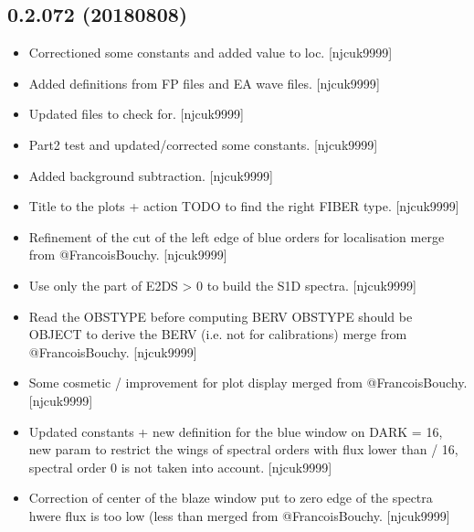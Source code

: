 \documentclass[a4paper,10pt,english]{report}
\begin{document}
\subsection{0.2.072 (2018\sphinxhyphen{}08\sphinxhyphen{}08)}
\label{\detokenize{misc/changelog:id395}}\begin{itemize}
\item {} 
Correctioned some constants and added value to loc. {[}njcuk9999{]}

\item {} 
Added definitions from FP files and EA wave files. {[}njcuk9999{]}

\item {} 
Updated  files to check for. {[}njcuk9999{]}

\item {} 
Part2 test and updated/corrected some constants. {[}njcuk9999{]}

\item {} 
Added background subtraction. {[}njcuk9999{]}

\item {} 
Title to the plots + action TODO to find the right FIBER type.
{[}njcuk9999{]}

\item {} 
Refinement of the cut of the left edge of blue orders for localisation
\sphinxhyphen{} merge from @FrancoisBouchy. {[}njcuk9999{]}

\item {} 
Use only the part of E2DS \textgreater{} 0 to build the S1D spectra. {[}njcuk9999{]}

\item {} 
Read the OBSTYPE before computing BERV \sphinxhyphen{} OBSTYPE should be OBJECT to
derive the BERV (i.e. not for calibrations) \sphinxhyphen{} merge from
@FrancoisBouchy. {[}njcuk9999{]}

\item {} 
Some cosmetic / improvement for plot display \sphinxhyphen{} merged from
@FrancoisBouchy. {[}njcuk9999{]}

\item {} 
Updated constants + new definition for the blue window on DARK \sphinxhyphen{}
 = 16, new param to restrict the wings of spectral
orders with flux lower than  / 16, spectral order 0 is
not taken into account. {[}njcuk9999{]}

\item {} 
Correction of center of the blaze window \sphinxhyphen{} put to zero edge of the
spectra hwere flux is too low (less than 
 \sphinxhyphen{} merged from @FrancoisBouchy. {[}njcuk9999{]}


\end{itemize}
\end{document}
